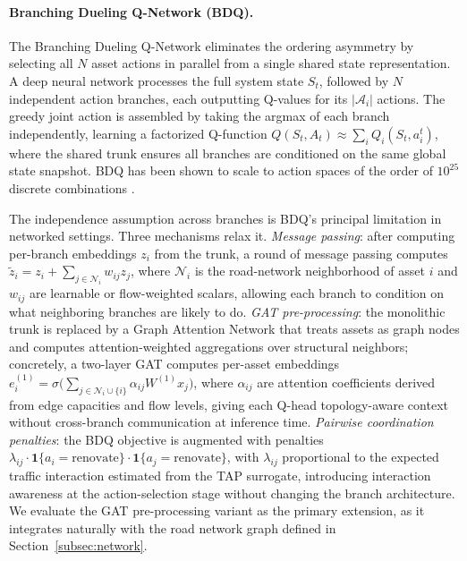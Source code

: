 \documentclass[3p, twocolumn]{elsarticle}
\begin{document}
\paragraph{Branching Dueling Q-Network (BDQ).}
The Branching Dueling Q-Network \citep{tavakoli_action_2018} eliminates the ordering asymmetry by selecting all $N$ asset actions in parallel from a single shared state representation. A deep neural network processes the full system state $S_t$, followed by $N$ independent action branches, each outputting Q-values for its $|\mathcal{A}_i|$ actions. The greedy joint action is assembled by taking the argmax of each branch independently, learning a factorized Q-function $Q(S_t, A_t) \approx \sum_i Q_i(S_t, a_i^t)$, where the shared trunk ensures all branches are conditioned on the same global state snapshot. BDQ has been shown to scale to action spaces of the order of $10^{25}$ discrete combinations \citep{tavakoli_action_2018}.

The independence assumption across branches is BDQ's principal limitation in networked settings. Three mechanisms relax it. \emph{Message passing}: after computing per-branch embeddings $z_i$ from the trunk, a round of message passing computes $\tilde{z}_i = z_i + \sum_{j \in \mathcal{N}_i} w_{ij} z_j$, where $\mathcal{N}_i$ is the road-network neighborhood of asset $i$ and $w_{ij}$ are learnable or flow-weighted scalars, allowing each branch to condition on what neighboring branches are likely to do. \emph{GAT pre-processing}: the monolithic trunk is replaced by a Graph Attention Network \citep{velickovic_graph_2018} that treats assets as graph nodes and computes attention-weighted aggregations over structural neighbors; concretely, a two-layer GAT computes per-asset embeddings $e_i^{(1)} = \sigma\!\bigl(\sum_{j \in \mathcal{N}_i \cup \{i\}} \alpha_{ij} W^{(1)} x_j\bigr)$, where $\alpha_{ij}$ are attention coefficients derived from edge capacities and flow levels, giving each Q-head topology-aware context without cross-branch communication at inference time. \emph{Pairwise coordination penalties}: the BDQ objective is augmented with penalties $\lambda_{ij} \cdot \mathbf{1}\{a_i = \text{renovate}\} \cdot \mathbf{1}\{a_j = \text{renovate}\}$, with $\lambda_{ij}$ proportional to the expected traffic interaction estimated from the TAP surrogate, introducing interaction awareness at the action-selection stage without changing the branch architecture. We evaluate the GAT pre-processing variant as the primary extension, as it integrates naturally with the road network graph defined in Section~\ref{subsec:network}.
\end{document}
